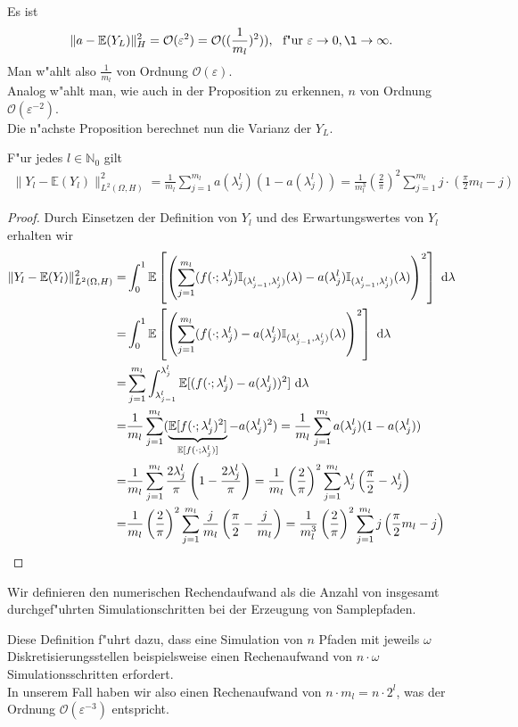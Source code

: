 Es ist 
\begin{align*}
\|a-\mathbb{E}(Y_L)\|^2_H=\mathcal{O}(\varepsilon^2)=\mathcal{O}((\frac{1}{m_l})^2)), \ \ \text{f"ur}\  \varepsilon \rightarrow 0, \l \rightarrow \infty.
\end{align*} 
Man w"ahlt also $\frac{1}{m_l}$ von Ordnung $\mathcal{O}(\varepsilon)$.\\
Analog w"ahlt man, wie auch in der Proposition zu erkennen, $n$ von Ordnung $\mathcal{O}(\varepsilon^{-2})$.\\
Die n"achste Proposition berechnet nun die Varianz der $Y_L$.
\begin{prop}
F"ur jedes $l\in\mathbb{N}_0$ gilt
\begin{align*}
\|Y_l-\mathbb{E}(Y_l)\|^2_{L^2(\Omega,H)}=\frac{1}{m_l}\sum_{j=1}^{m_l}a(\lambda_j^l)(1-a(\lambda_j^l))=\frac{1}{m_l^3}\left(\frac{2}{\pi}\right)^2\sum_{j=1}^{m_l} j\cdot \left(\frac{\pi}{2}m_l-j\right)
\end{align*}
\end{prop}
\newpage
\begin{proof}
Durch Einsetzen der Definition von $Y_l$ und des Erwartungswertes von $Y_l$ erhalten wir
\allowdisplaybreaks
\begin{align*}
\|Y_l-\mathbb{E}(Y_l)\|^2_{L^2(\Omega,H)}=&\int_0^1\mathbb{E}\left[\left(\sum_{j=1}^{m_l}(f(\cdot;\lambda_j^l)\mathbb{I}_{(\lambda_{j-1}^l,\lambda_j^l)}(\lambda)-a(\lambda_j^l)\mathbb{I}_{(\lambda_{j-1}^l,\lambda_j^l)}(\lambda)\right)^2\right]\text{ d} \lambda\\=&\int_0^1\mathbb{E}\left[\left(\sum_{j=1}^{m_l}(f(\cdot;\lambda_j^l)-a(\lambda_j^l)\mathbb{I}_{(\lambda_{j-1}^l,\lambda_j^l)}(\lambda)\right)^2\right]\text{ d} \lambda\\=&\sum_{j=1}^{m_l} \int_{\lambda_{j-1}^l}^{\lambda_j^l}\mathbb{E}[(f(\cdot;\lambda_j^l)-a(\lambda_j^l))^2]\text{ d} \lambda\\=&\frac{1}{m_l}\sum_{j=1}^{m_l}(\underbrace{\mathbb{E}[f(\cdot;\lambda_j^l)^2]}_{\mathbb{E}[f(\cdot;\lambda_j^l)]}-a(\lambda_j^l)^2)=\frac{1}{m_l}\sum_{j=1}^{m_l}a(\lambda_j^l)(1-a(\lambda_j^l))\\=&\frac{1}{m_l}\sum_{j=1}^{m_l}\frac{2\lambda_j^l}{\pi}\left(1-\frac{2\lambda_j^l}{\pi}\right)=\frac{1}{m_l}\left(\frac{2}{\pi}\right)^2\sum_{j=1}^{m_l}\lambda_j^l\left(\frac{\pi}{2}-\lambda_j^l\right)\\=&\frac{1}{m_l}\left(\frac{2}{\pi}\right)^2\sum_{j=1}^{m_l}\frac{j}{m_l}\left(\frac{\pi}{2}-\frac{j}{m_l}\right)=\frac{1}{m_l^3}\left(\frac{2}{\pi}\right)^2\sum_{j=1}^{m_l}j\left(\frac{\pi}{2}m_l-j\right)
\end{align*}
\end{proof}
\begin{df}[Rechenaufwand]
Wir definieren den numerischen Rechendaufwand als die Anzahl von insgesamt durchgef"uhrten Simulationschritten bei der Erzeugung von Samplepfaden.
\end{df}
Diese Definition f"uhrt dazu, dass eine Simulation von $n$ Pfaden mit jeweils $\omega$ Diskretisierungsstellen beispielsweise einen Rechenaufwand von $n \cdot \omega$ Simulationsschritten erfordert.\\
In unserem Fall haben wir also einen Rechenaufwand von $ n \cdot m_l =n \cdot 2^l$, was der Ordnung $\mathcal{O}(\varepsilon^{-3})$ entspricht.